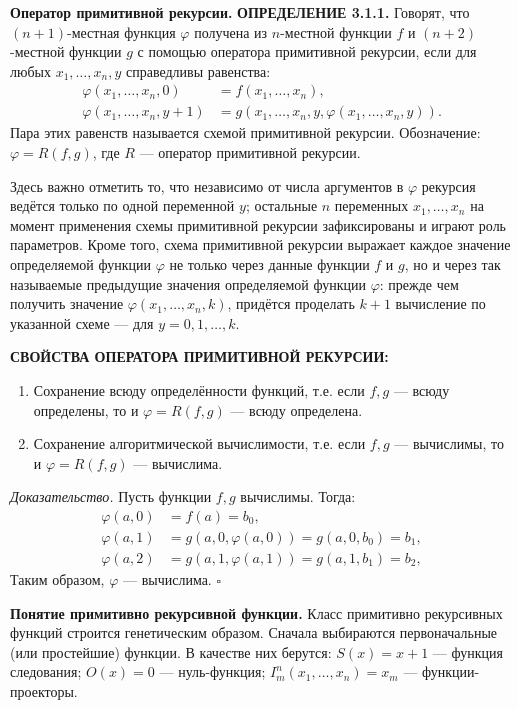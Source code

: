 \documentclass[a4paper,12pt]{article}
\begin{document}
\textbf{Оператор примитивной рекурсии.} \textbf{ОПРЕДЕЛЕНИЕ 3.1.1.} Говорят, что \((n + 1)\)-местная функция \(\varphi\) получена из \(n\)-местной функции \(f\) и \((n + 2)\)-местной функции \(g\) с помощью оператора примитивной рекурсии, если для любых \(x_1, \dots, x_n, y\) справедливы равенства:
\[
\begin{aligned}
\varphi(x_1, \dots, x_n, 0) &= f(x_1, \dots, x_n), \\
\varphi(x_1, \dots, x_n, y + 1) &= g(x_1, \dots, x_n, y, \varphi(x_1, \dots, x_n, y)).
\end{aligned}
\]
Пара этих равенств называется схемой примитивной рекурсии. Обозначение: \(\varphi = R(f, g)\), где \(R\) --- оператор примитивной рекурсии.

Здесь важно отметить то, что независимо от числа аргументов в \(\varphi\) рекурсия ведётся только по одной переменной \(y\); остальные \(n\) переменных \(x_1, \dots, x_n\) на момент применения схемы примитивной рекурсии зафиксированы и играют роль параметров. Кроме того, схема примитивной рекурсии выражает каждое значение определяемой функции \(\varphi\) не только через данные функции \(f\) и \(g\), но и через так называемые предыдущие значения определяемой функции \(\varphi\): прежде чем получить значение \(\varphi(x_1, \dots, x_n, k)\), придётся проделать \(k + 1\) вычисление по указанной схеме --- для \(y = 0, 1, \dots, k\).

\textbf{СВОЙСТВА ОПЕРАТОРА ПРИМИТИВНОЙ РЕКУРСИИ:}
\begin{enumerate}
    \item Сохранение всюду определённости функций, т.е. если \(f, g\) --- всюду определены, то и \(\varphi = R(f, g)\) --- всюду определена.
    \item Сохранение алгоритмической вычислимости, т.е. если \(f, g\) --- вычислимы, то и \(\varphi = R(f, g)\) --- вычислима.
\end{enumerate}

\textit{Доказательство.} Пусть функции \(f, g\) вычислимы. Тогда:
\[
\begin{aligned}
\varphi(a, 0) &= f(a) = b_0, \\
\varphi(a, 1) &= g(a, 0, \varphi(a, 0)) = g(a, 0, b_0) = b_1, \\
\varphi(a, 2) &= g(a, 1, \varphi(a, 1)) = g(a, 1, b_1) = b_2,
\end{aligned}
\]
Таким образом, \(\varphi\) --- вычислима. \(\square\)

\textbf{Понятие примитивно рекурсивной функции.} Класс примитивно рекурсивных функций строится генетическим образом. Сначала выбираются первоначальные (или простейшие) функции. В качестве них берутся: \(S(x) = x + 1\) --- функция следования; \(O(x) = 0\) --- нуль-функция; \(I_m^n(x_1, \dots, x_n) = x_m\) --- функции-проекторы.
\end{document}
